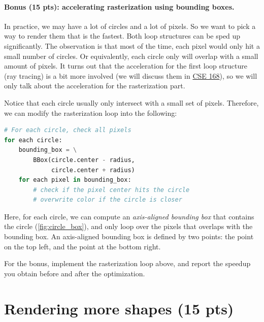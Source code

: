 \paragraph{Bonus (15 pts): accelerating rasterization using bounding boxes.} In practice, we may have a lot of circles and a lot of pixels. So we want to pick a way to render them that is the fastest. Both loop structures can be sped up significantly. The observation is that most of the time, each pixel would only hit a small number of circles. Or equivalently, each circle only will overlap with a small amount of pixels. It turns out that the acceleration for the first loop structure (ray tracing) is a bit more involved (we will discuss them in \href{https://cseweb.ucsd.edu/~tzli/cse168}{CSE 168}), so we will only talk about the acceleration for the rasterization part.

Notice that each circle usually only intersect with a small set of pixels. Therefore, we can modify the rasterization loop into the following:
\begin{lstlisting}[language=Python]
# For each circle, check all pixels
for each circle:
    bounding_box = \
        BBox(circle.center - radius,
             circle.center + radius)
    for each pixel in bounding_box:
        # check if the pixel center hits the circle
        # overwrite color if the circle is closer
\end{lstlisting}
Here, for each circle, we can compute an \emph{axis-aligned bounding box} that contains the circle (\cref{fig:circle_box}), and only loop over the pixels that overlaps with the bounding box. An axis-aligned bounding box is defined by two points: the point on the top left, and the point at the bottom right. 

For the bonus, implement the rasterization loop above, and report the speedup you obtain before and after the optimization.

\section{Rendering more shapes (15 pts)}

